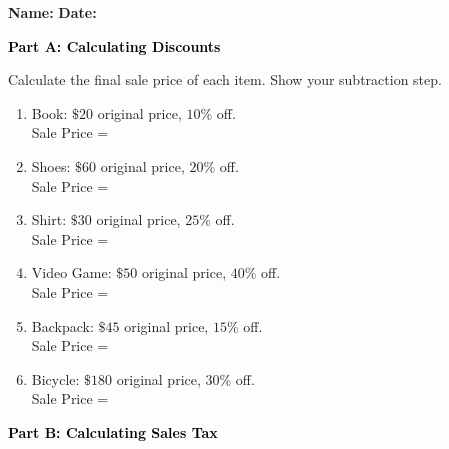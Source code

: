 \documentclass[12pt, letterpaper, fleqn]{article}
\newcommand{\blanklong}{\underline{\hspace{6.5cm}}}
\begin{document}
\textbf{Name:} \underline{\hspace{5cm}}
\hfill
\textbf{Date:} \underline{\hspace{3cm}}\\

\begin{tcolorbox}[colback=black!10]
    \large\textcolor{black}{\textbf{Part A: Calculating Discounts}}
\end{tcolorbox}

\vspace{3mm}

\noindent
Calculate the final sale price of each item. Show your subtraction step.

\vspace{5mm}

\begin{enumerate}[itemsep=1.8cm, leftmargin=0.6cm]
\item Book: $\$20$ original price, $10\%$ off. \\
Sale Price = \blanklong

\item Shoes: $\$60$ original price, $20\%$ off. \\
Sale Price = \blanklong

\item Shirt: $\$30$ original price, $25\%$ off. \\
Sale Price = \blanklong

\item Video Game: $\$50$ original price, $40\%$ off. \\
Sale Price = \blanklong

\item Backpack: $\$45$ original price, $15\%$ off. \\
Sale Price = \blanklong

\item Bicycle: $\$180$ original price, $30\%$ off. \\
Sale Price = \blanklong
\end{enumerate}

\newpage

\begin{tcolorbox}[colback=black!10]
    \large\textcolor{black}{\textbf{Part B: Calculating Sales Tax}}
\end{tcolorbox}
\end{document}

